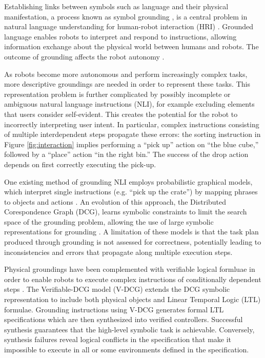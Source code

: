 \documentclass[letterpaper]{article} %
\begin{document}
Establishing links between symbols such as language and their physical manifestation, a process known as symbol grounding \cite{harnad1990symbol}, is a central problem in natural language understanding for human-robot interaction (HRI) \cite{stubbs2007autonomy,lemaignan2012grounding}. Grounded language enables robots to interpret and respond to instructions, allowing information exchange about the physical world between humans and robots. The outcome of grounding affects the robot autonomy \cite{goodrich2007human}.

As robots become more autonomous and perform increasingly complex tasks, more descriptive groundings are needed in order to represent these tasks. This representation problem is further complicated by possibly incomplete or ambiguous natural language instructions (NLI), for example excluding elements that users consider self-evident. This creates the potential for the robot to incorrectly interpreting user intent.
In particular, complex instructions consisting of multiple interdependent steps propagate these errors: the sorting instruction in Figure \ref{fig:interaction} implies performing a ``pick up'' action on ``the blue cube,'' followed by a ``place'' action ``in the right bin.'' The success of the drop action depends on first correctly executing the pick-up.

One existing method of grounding NLI employs probabilistic graphical models, which interpret single instructions (e.g. ``pick up the crate'') by mapping phrases to objects and actions \cite{tellex2011understanding}. An evolution of this approach, the Distributed Corespondence Graph (DCG), learns symbolic constraints to limit the search space of the grounding problem, allowing the use of large symbolic representations for grounding \cite{howard2014natural}. A limitation of these models is that the task plan produced through grounding is not assessed for correctness, potentially leading to inconsistencies and errors that propagate along multiple execution steps.

Physical groundings have been complemented with verifiable logical formluae in order to enable robots to execute complex instructions of conditionally dependent steps \cite{boteanu2016model}. The Verifiable-DCG model (V-DCG) extends the DCG symbolic representation to include both physical objects and Linear Temporal Logic (LTL) formulae. Grounding instructions using V-DCG generates formal LTL specifications which are then synthesized into verified controllers. Successful synthesis guarantees that the high-level symbolic task is achievable. Conversely, synthesis failures reveal logical conflicts in the specification that make it impossible to execute in all or some environments defined in the specification.
\end{document}
